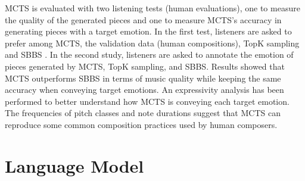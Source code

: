 MCTS is evaluated with two listening tests (human evaluations), one to measure the quality of the generated pieces and one to measure MCTS's accuracy in generating pieces with a target emotion. In the first test, listeners are asked to prefer among MCTS, the validation data (human compositions), TopK sampling and SBBS \cite{ferreira2020computer}. In the second study, listeners are asked to annotate the emotion of pieces generated by MCTS, TopK sampling, and SBBS. Results showed that MCTS outperforms SBBS in terms of music quality while keeping the same accuracy when conveying target emotions. An expressivity analysis \cite{smith2010analyzing} has been performed to better understand how MCTS is conveying each target emotion. The frequencies of pitch classes and note durations suggest that MCTS can reproduce some common composition practices used by human composers.



\section{Language Model}


